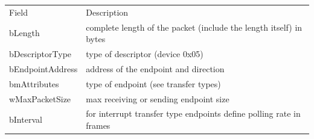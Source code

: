 \begin{longtable}[]{@{}ll@{}}
\toprule
\begin{minipage}[t]{0.47\columnwidth}\raggedright\strut
{Field}
\strut\end{minipage} &
\begin{minipage}[t]{0.47\columnwidth}\raggedright\strut
{Description}
\strut\end{minipage}\tabularnewline
\begin{minipage}[t]{0.47\columnwidth}\raggedright\strut
{bLength}
\strut\end{minipage} &
\begin{minipage}[t]{0.47\columnwidth}\raggedright\strut
{complete length of the packet (include the length itself) in bytes}
\strut\end{minipage}\tabularnewline
\begin{minipage}[t]{0.47\columnwidth}\raggedright\strut
{bDescriptorType}
\strut\end{minipage} &
\begin{minipage}[t]{0.47\columnwidth}\raggedright\strut
{type of descriptor (device 0x05)}
\strut\end{minipage}\tabularnewline
\begin{minipage}[t]{0.47\columnwidth}\raggedright\strut
{bEndpointAddress}
\strut\end{minipage} &
\begin{minipage}[t]{0.47\columnwidth}\raggedright\strut
{address of the endpoint and direction}
\strut\end{minipage}\tabularnewline
\begin{minipage}[t]{0.47\columnwidth}\raggedright\strut
{bmAttributes}
\strut\end{minipage} &
\begin{minipage}[t]{0.47\columnwidth}\raggedright\strut
{type of endpoint (see transfer types)}
\strut\end{minipage}\tabularnewline
\begin{minipage}[t]{0.47\columnwidth}\raggedright\strut
{wMaxPacketSize}
\strut\end{minipage} &
\begin{minipage}[t]{0.47\columnwidth}\raggedright\strut
{max receiving or sending endpoint size}
\strut\end{minipage}\tabularnewline
\begin{minipage}[t]{0.47\columnwidth}\raggedright\strut
{bInterval}
\strut\end{minipage} &
\begin{minipage}[t]{0.47\columnwidth}\raggedright\strut
{for interrupt transfer type endpoints define polling rate in frames}
\strut\end{minipage}\tabularnewline
\bottomrule
\end{longtable}

